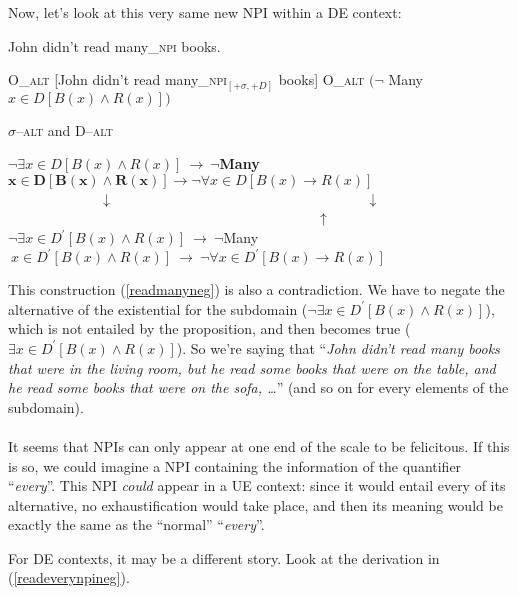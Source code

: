 \documentclass[a4paper,11pt]{article}
\newcommand{\reff}[1]{(\ref{#1})}
\newcommand{\exs}[2][]{\begin{exe}\ex #1 \begin{xlist}#2\end{xlist}\end{exe}}
\begin{document}
Now, let's look at this very same new NPI within a DE context:
\exs[\label{readmanyneg}]{
  \ex John didn't read many_{\textsc{npi}} books.
  \ex
    \begin{xlist}
      \ex\label{readmanyoneg} O_{\textsc{alt}} [John didn't read many_{\textsc{npi}}$_{[+\sigma,+D]}$ books]
      \ex O_{\textsc{alt}} $(\neg$ Many ${x \in D}[B(x) \wedge R(x)])$
    \end{xlist}
  \ex\label{readmanyaltneg} $\sigma$--\textsc{alt} and D--\textsc{alt}
    \begin{xlist}
      \ex $\neg \exists{x \in D}[B(x) \wedge R(x)]~\longrightarrow~\neg $\textbf{Many}$\boldsymbol{{x\in D}[B(x) \wedge R(x)]}\longrightarrow\neg \forall{x \in D}[B(x) \rightarrow R(x)]$\\
      \indent~~~~~~~~~~~~~$\downarrow$~~~~~~~~~~~~~~~~~~~~~~~~~~~~~~~~~~~~$\downarrow$~~~~~~~~~~~~~~~~~~~~~~~~~~~~~~~~~~~~~~~~~~~~$\uparrow$
      \ex $\neg \exists{x \in D^{\prime}}[B(x) \wedge R(x)]~\longrightarrow~\neg $Many$~{x \in D^{\prime}}[B(x) \wedge R(x)]~\longrightarrow~\neg \forall{x \in D^{\prime}}[B(x) \rightarrow R(x)]$
    \end{xlist}
}
%
This construction \reff{readmanyneg} is also a contradiction. We have to negate the alternative of the existential for the subdomain ($\neg \exists{x \in D^{\prime}}[B(x) \wedge R(x)]$), which is not entailed by the proposition, and then becomes true ($\exists{x \in D^{\prime}}[B(x) \wedge R(x)]$). So we're saying that \enquote{\emph{John didn't read many books that were in the living room, but he read some books that were on the table, and he read some books that were on the sofa, \ldots{}}} (and so on for every elements of the subdomain).

\paragraph{}
It seems that NPIs can only appear at one end of the scale to be felicitous. If this is so, we could imagine a NPI containing the information of the quantifier \enquote{\emph{every}}. This NPI \emph{could} appear in a UE context: since it would entail every of its alternative, no exhaustification would take place, and then its meaning would be exactly the same as the \enquote{normal} \enquote{\emph{every}}.

For DE contexts, it may be a different story. Look at the derivation in \reff{readeverynpineg}.
\end{document}
